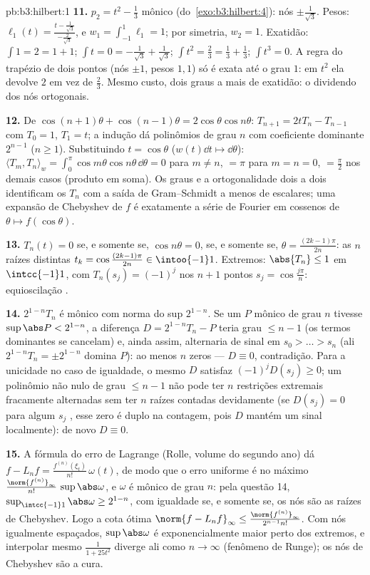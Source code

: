 \begin{solution}{pb:b3:hilbert:1}
\textbf{11.} $p_2 = t^2 - \frac13$ mônico (do~\cref{exo:b3:hilbert:4}): nós $\pm\frac1{\sqrt3}$. Pesos:
$\ell_1(t) = \frac{t - \frac1{\sqrt3}}{-\frac2{\sqrt3}}$, e
$w_1 = \int_{-1}^1\ell_1 = 1$; por simetria, $w_2 = 1$.
Exatidão: $\int 1 = 2 = 1 + 1$; $\int t = 0 =
-\frac1{\sqrt3} + \frac1{\sqrt3}$; $\int t^2 = \frac23 =
\frac13 + \frac13$; $\int t^3 = 0$. A regra do trapézio de dois pontos
(nós $\pm1$, pesos $1, 1$) só é exata até o grau
$1$: em $t^2$ ela devolve $2$ em vez de $\frac23$. Mesmo custo,
dois graus a mais de exatidão: o dividendo dos nós
ortogonais.

\textbf{12.} De $\cos(n{+}1)\theta + \cos(n{-}1)\theta =
2\cos\theta\cos n\theta$: $T_{n+1} = 2tT_n - T_{n-1}$ com
$T_0 = 1$, $T_1 = t$; a indução dá polinômios de grau
$n$ com coeficiente dominante $2^{n-1}$ ($n \geq 1$).
Substituindo $t = \cos\theta$ ($w(t)\dd t \mapsto
\dd\theta$): $\langle T_m, T_n\rangle_w =
\int_0^\pi\cos m\theta\cos n\theta\,\dd\theta = 0$ para $m
\neq n$, $= \pi$ para $m = n = 0$, $= \frac\pi2$ nos demais casos
(produto em soma). Os graus e a ortogonalidade dois a dois
identificam os $T_n$ com a saída de Gram--Schmidt a menos de
escalares; uma expansão de Chebyshev de $f$ é exatamente a
série de Fourier em cossenos de $\theta \mapsto f(\cos\theta)$.

\textbf{13.} $T_n(t) = 0$ se, e somente se, $\cos n\theta = 0$, se, e somente se,
$\theta = \frac{(2k-1)\pi}{2n}$: as $n$ raízes distintas
$t_k = \cos\frac{(2k-1)\pi}{2n} \in \intoo{-1}1$. Extremos:
$\abs{T_n} \leq 1$ em $\intcc{-1}1$, com $T_n(s_j) =
(-1)^j$ nos $n + 1$ pontos $s_j = \cos\frac{j\pi}n$:
equioscilação .

\textbf{14.} $2^{1-n}T_n$ é mônico com norma do sup $2^{1-n}$.
Se um $P$ mônico de grau $n$ tivesse $\sup\abs P < 2^{1-n}$, a
diferença $D = 2^{1-n}T_n - P$ teria grau $\leq n -
1$ (os termos dominantes se cancelam) e, ainda assim, alternaria de sinal em $s_0 >
\dots > s_n$ (ali $2^{1-n}T_n = \pm2^{1-n}$ domina
$P$): ao menos $n$ zeros --- $D \equiv 0$, contradição.
Para a unicidade no caso de igualdade, o mesmo $D$ satisfaz
$(-1)^jD(s_j) \geq 0$; um polinômio não nulo de grau $\leq
n-1$ não pode ter $n$ restrições extremais
fracamente alternadas sem ter $n$ raízes contadas devidamente (se
$D(s_j) = 0$ para algum $s_j$ , esse zero é duplo
na contagem, pois $D$ mantém um sinal localmente): de novo $D
\equiv 0$.

\textbf{15.} A fórmula do erro de Lagrange (Rolle, volume do segundo ano)
dá $f - L_nf = \frac{f^{(n)}(\xi_t)}{n!}\,\omega(t)$, de modo que
o erro uniforme é no máximo $\frac{\norm{f^{(n)}}_\infty}
{n!}\,\sup\abs\omega$, e $\omega$ é mônico de grau $n$:
pela questão 14, $\sup_{\intcc{-1}1}\abs\omega \geq 2^{1-n}$,
com igualdade se, e somente se, os nós são as raízes de Chebyshev. Logo
a cota ótima $\norm{f - L_nf}_\infty \leq
\frac{\norm{f^{(n)}}_\infty}{2^{n-1}n!}$. Com nós igualmente
espaçados, $\sup\abs\omega$ é exponencialmente maior perto
dos extremos, e interpolar mesmo $\frac1{1 + 25t^2}$
diverge ali como $n \to \infty$ (fenômeno de Runge);
os nós de Chebyshev são a cura.


\end{solution}
